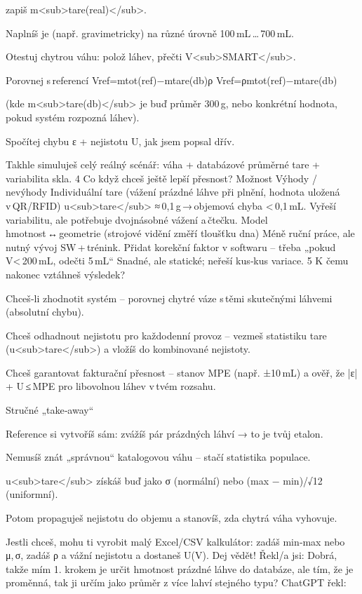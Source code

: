         zapiš m<sub>tare(real)</sub>.

    Naplníš je (např. gravimetricky) na různé úrovně 100 mL … 700 mL.

    Otestuj chytrou váhu: polož láhev, přečti V<sub>SMART</sub>.

    Porovnej s referencí
    Vref=mtot(ref)−mtare(db)ρ
    Vref​=ρmtot(ref)​−mtare(db)​​

    (kde m<sub>tare(db)</sub> je buď průměr 300 g, nebo konkrétní hodnota, pokud systém rozpozná láhev).

    Spočítej chybu ε + nejistotu U, jak jsem popsal dřív.

Takhle simuluješ celý reálný scénář: váha + databázové průměrné tare + variabilita skla.
4  Co když chceš ještě lepší přesnost?
Možnost	Výhody / nevýhody
Individuální tare (vážení prázdné láhve při plnění, hodnota uložená v QR/RFID)	u<sub>tare</sub> ≈ 0,1 g → objemová chyba < 0,1 mL. Vyřeší variabilitu, ale potřebuje dvojnásobné vážení a čtečku.
Model hmotnost ↔ geometrie (strojové vidění změří tloušťku dna)	Méně ruční práce, ale nutný vývoj SW + trénink.
Přidat korekční faktor v softwaru – třeba „pokud V< 200 mL, odečti 5 mL“	Snadné, ale statické; neřeší kus‑kus variace.
5  K čemu nakonec vztáhneš výsledek?

    Chceš‑li zhodnotit systém – porovnej chytré váze s těmi skutečnými láhvemi (absolutní chybu).

    Chceš odhadnout nejistotu pro každodenní provoz – vezmeš statistiku tare (u<sub>tare</sub>) a vložíš do kombinované nejistoty.

    Chceš garantovat fakturační přesnost – stanov MPE (např. ±10 mL) a ověř, že |ε| + U ≤ MPE pro libovolnou láhev v tvém rozsahu.

Stručné „take‑away“

    Reference si vytvoříš sám: zvážíš pár prázdných láhví → to je tvůj etalon.

    Nemusíš znát „správnou“ katalogovou váhu – stačí statistika populace.

    u<sub>tare</sub> získáš buď jako σ (normální) nebo (max − min)/√12 (uniformní).

    Potom propaguješ nejistotu do objemu a stanovíš, zda chytrá váha vyhovuje.

Jestli chceš, mohu ti vyrobit malý Excel/CSV kalkulátor: zadáš min‑max nebo μ, σ, zadáš ρ a vážní nejistotu a dostaneš U(V). Dej vědět!
Řekl/a jsi:
Dobrá, takže mím 1. krokem je určit hmotnost prázdné láhve do databáze, ale tím, že je proměnná, tak ji určím jako průměr z více lahví stejného typu?
ChatGPT řekl:

